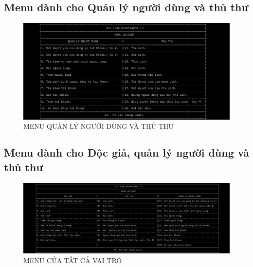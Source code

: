 \documentclass[16pt,a4paper,oneside]{article}
\begin{document}
\subsection{Menu dành cho Quản lý người dùng và thủ thư}
\begin{figure}[htp]
	\begin{center}
		\includegraphics[width=18cm]{Images/menu_quanlynguoidungvathuthu.png}
		\caption{MENU QUẢN LÝ NGƯỜI DÙNG VÀ THỦ THƯ}
	\end{center}
\end{figure}
\subsection{Menu dành cho Độc giả, quản lý người dùng và thủ thư}
\begin{figure}[htp]
	\begin{center}
		\includegraphics[width=18cm]{Images/menu_tatca.png}
		\caption{MENU CỦA TẤT CẢ VAI TRÒ}
	\end{center}
\end{figure}
\end{document}
